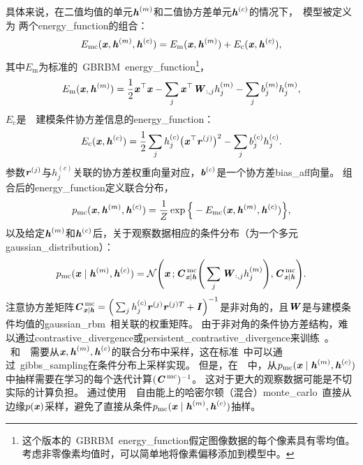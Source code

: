 具体来说，在二值均值的单元$\Vh^{(m)}$和二值协方差单元$\Vh^{(c)}$的情况下，~模型被定义为
两个\gls{energy_function}的组合：
\begin{align}
 E_{\text{mc}}(\Vx, \Vh^{(m)}, \Vh^{(c)}) = E_{\text{m}}(\Vx, \Vh^{(m)}) + E_{\text{c}}(\Vx, \Vh^{(c)}),
\end{align}
其中$E_{\text{m}}$为标准的~\gls{GBRBM}~\gls{energy_function}\footnote{这个版本的~\gls{GBRBM}~\gls{energy_function}假定图像数据的每个像素具有零均值。考虑非零像素均值时，可以简单地将像素偏移添加到模型中。}，
\begin{align} \label{eq:2044e}
E_{\text{m}}(\Vx, \Vh^{(m)}) = \frac{1}{2}\Vx^\top \Vx - \sum_j \Vx^\top \MW_{:,j} h_j^{(m)} - \sum_j 
 b_j^{(m)} h_j^{(m)},
\end{align}
$E_{\text{c}}$是~~建模条件协方差信息的\gls{energy_function}：
\begin{align}
 E_{\text{c}}(\Vx, \Vh^{(c)}) = \frac{1}{2} \sum_j h_j^{(c)} \big( \Vx^\top \Vr^{(j)}\big)^2 - \sum_j 
 b_j^{(c)} h_j^{(c)}.
\end{align}
参数$\Vr^{(j)}$与$h_j^{(c)}$关联的协方差权重向量对应，$\Vb^{(c)}$是一个协方差\gls{bias_aff}向量。
组合后的\gls{energy_function}定义联合分布，
\begin{align}
 p_{\text{mc}}(\Vx, \Vh^{(m)}, \Vh^{(c)}) = \frac{1}{Z} \exp \Big\{ -E_{\text{mc}}(\Vx, \Vh^{(m)}, 
 \Vh^{(c)}) \Big\},
\end{align}
以及给定$\Vh^{(m)}$和$\Vh^{(c)}$后，关于观察数据相应的条件分布（为一个多元\gls{gaussian_distribution}）：
\begin{align}
 p_{\text{mc}}(\Vx \mid \Vh^{(m)}, \Vh^{(c)})  = \CalN \Bigg( \Vx \,; \MC_{\Vx \mid \Vh}^{\,\text{mc}} \Bigg(
\sum_j \MW_{:,j}h_j^{(m)} \Bigg), \MC_{\Vx \mid \Vh}^{\,\text{mc}}
 \Bigg).
\end{align}
注意协方差矩阵$\MC_{\Vx \mid \Vh}^{\,\text{mc}} = \Big( \sum_j h_j^{(c)} \Vr^{(j)} \Vr^{(j)T} + \MI
\Big)^{-1}$是非对角的，且$\MW$是与建模条件均值的\gls{gaussian_rbm}~相关联的权重矩阵。
由于非对角的条件协方差结构，难以通过\gls{contrastive_divergence}或\gls{persistent_contrastive_divergence}来训练~。
~和~~需要从$\Vx,\Vh^{(m)},\Vh^{(c)}$的联合分布中采样，这在标准~中可以通过~\gls{gibbs_sampling}在条件分布上采样实现。
但是，在~~中，从$ p_{\text{mc}}(\Vx  \mid \Vh^{(m)}, \Vh^{(c)}) $中抽样需要在学习的每个迭代计算$(\MC^{\,\text{mc}})^{-1}$。
这对于更大的观察数据可能是不切实际的计算负担。
\citet{Ranzato2010b-short}通过使用~~自由能上的哈密尔顿（混合）\gls{monte_carlo}~\citep{Neal93b}直接从边缘$p(\Vx)$采样，避免了直接从条件$  p_{\text{mc}}(\Vx  \mid \Vh^{(m)}, \Vh^{(c)}) $抽样。

